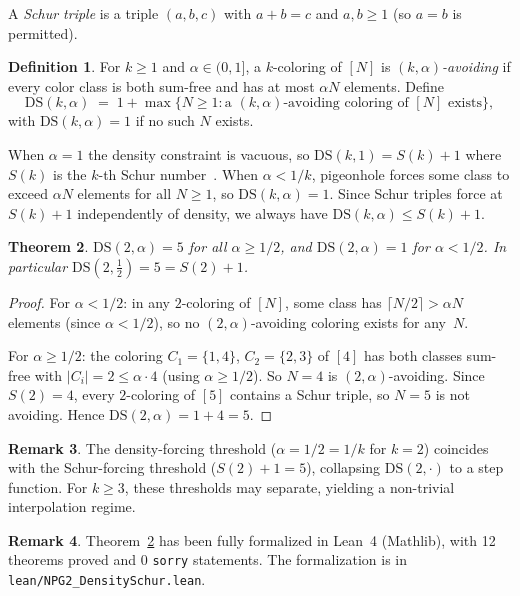 \documentclass[11pt]{article}
\theoremstyle{plain}
\newtheorem{theorem}{Theorem}[section]
\theoremstyle{definition}
\newtheorem{definition}[theorem]{Definition}
\newtheorem{remark}[theorem]{Remark}
\newcommand{\DS}{\mathrm{DS}}
\begin{document}
A \emph{Schur triple} is a triple $(a,b,c)$ with $a+b=c$ and
$a,b\ge 1$ (so $a=b$ is permitted).

\begin{definition}\label{def:ds}
For $k\ge 1$ and $\alpha\in(0,1]$, a $k$-coloring of $[N]$ is
\emph{$(k,\alpha)$-avoiding} if every color class is both sum-free
and has at most $\alpha N$ elements. Define
\[
\DS(k,\alpha) \;=\; 1+\max\{N\ge 1: \text{a $(k,\alpha)$-avoiding
coloring of $[N]$ exists}\},
\]
with $\DS(k,\alpha)=1$ if no such $N$ exists.
\end{definition}

When $\alpha=1$ the density constraint is vacuous, so
$\DS(k,1)=S(k)+1$ where $S(k)$ is the $k$-th Schur
number~\cite{schur1916}. When $\alpha<1/k$, pigeonhole forces some
class to exceed $\alpha N$ elements for all $N\ge 1$, so
$\DS(k,\alpha)=1$. Since Schur triples force at $S(k)+1$
independently of density, we always have $\DS(k,\alpha)\le S(k)+1$.

\begin{theorem}\label{thm:ds}
$\DS(2,\alpha)=5$ for all $\alpha\ge 1/2$, and $\DS(2,\alpha)=1$ for
$\alpha<1/2$. In particular $\DS(2,\tfrac{1}{2})=5=S(2)+1$.
\end{theorem}

\begin{proof}
For $\alpha<1/2$: in any $2$-coloring of $[N]$, some class has
$\lceil N/2\rceil>\alpha N$ elements (since $\alpha<1/2$), so no
$(2,\alpha)$-avoiding coloring exists for any~$N$.

For $\alpha\ge 1/2$: the coloring $C_1=\{1,4\}$, $C_2=\{2,3\}$ of
$[4]$ has both classes sum-free with $|C_i|=2\le\alpha\cdot 4$
(using $\alpha\ge 1/2$). So $N=4$ is $(2,\alpha)$-avoiding.
Since $S(2)=4$, every $2$-coloring of $[5]$ contains a Schur
triple, so $N=5$ is not avoiding. Hence $\DS(2,\alpha)=1+4=5$.
\end{proof}

\begin{remark}\label{rem:transition}
The density-forcing threshold ($\alpha=1/2=1/k$ for $k=2$)
coincides with the Schur-forcing threshold ($S(2)+1=5$),
collapsing $\DS(2,\cdot)$ to a step function. For $k\ge 3$, these
thresholds may separate, yielding a non-trivial interpolation regime.
\end{remark}

\begin{remark}\label{rem:lean}
Theorem~\ref{thm:ds} has been fully formalized in Lean~4 (Mathlib),
with 12 theorems proved and 0 \texttt{sorry} statements. The
formalization is in \texttt{lean/NPG2\_DensitySchur.lean}.
\end{remark}
\end{document}
